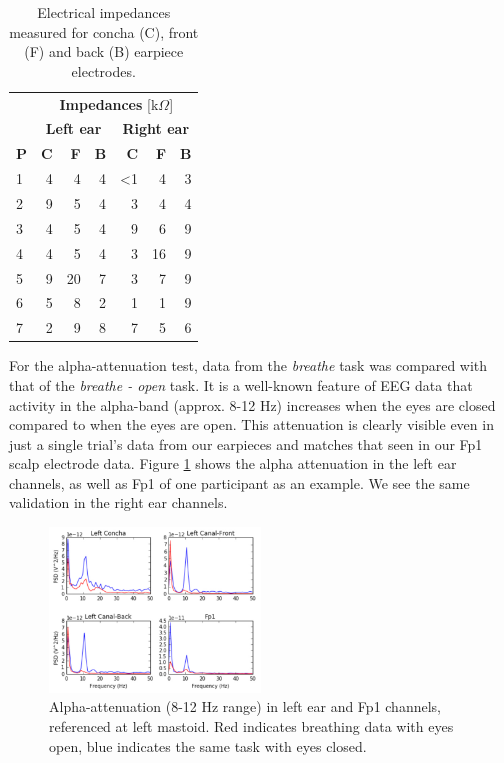 \documentclass{sigchi}
\begin{document}
\begin{table}[h]
\begin{center}
\begin{tabular}{lrrrrrr}
& \multicolumn{6}{c}{\textbf{Impedances} [k\(\Omega\)]} \\
\cline{2-7}
& \multicolumn{3}{|c|}{\textbf{Left ear}} & \multicolumn{3}{c|}{\textbf{Right ear}} \\
\textbf{P} & \textbf{C} & \textbf{F} & \textbf{B} & \textbf{C} & \textbf{F} & \textbf{B} \\
\hline
1 & 4 & 4 & 4 & \textless1 & 4 & 3\\
2 & 9 & 5 & 4 & 3 & 4 & 4\\
3 & 4 & 5 & 4 & 9 & 6 & 9\\
4 & 4 & 5 & 4 & 3 & 16 & 9\\
5 & 9 & 20 & 7 & 3 & 7 & 9\\
6 & 5 & 8 & 2 & 1 & 1 & 9\\
7 & 2 & 9 & 8 & 7 & 5 & 6\\
\end{tabular}
\end{center}
\caption{Electrical impedances measured for concha (C), front (F) and back (B) earpiece electrodes.}
\label{tab:impedances}
\end{table}

For the alpha-attenuation test, data from the \textit{breathe} task was compared with that of the \textit{breathe - open} task. It is a well-known feature of EEG data that activity in the alpha-band (approx. 8-12 Hz) increases when the eyes are closed compared to when the eyes are open. This attenuation is clearly visible even in just a single trial's data from our earpieces and matches that seen in our Fp1 scalp electrode data. Figure \ref{fig:alpha_atten} shows the alpha attenuation in the left ear channels, as well as Fp1 of one participant as an example. We see the same validation in the right ear channels.

\begin{figure}[h]
\centering
\includegraphics[width=0.5\textwidth]{figures/002_AlphaAtt_all.jpg}
\caption{Alpha-attenuation (8-12 Hz range) in left ear and Fp1 channels, referenced at left mastoid. Red indicates breathing data with eyes open, blue indicates the same task with eyes closed.}
\label{fig:alpha_atten}
\end{figure}
\end{document}
